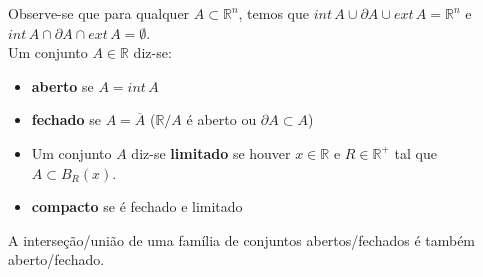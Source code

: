 \documentclass{article}
\begin{document}
Observe-se que para qualquer $A \subset \mathbb{R}^n$, temos que 
$int \, A \cup \partial A \cup ext \, A = \mathbb{R}^n$ e $int \, A \cap \partial A \cap ext \, A = \emptyset$.\\
Um conjunto $A \in \mathbb{R}$ diz-se: \vspace{-0.8mm}
\begin{itemize}
\item \textbf{aberto} se $A= int \, A$ \vspace{-1mm}
\item \textbf{fechado} se $A= \overline{A}$ ($\mathbb{R}/A$ é aberto ou $\partial A \subset A$) \vspace{-0.8mm}
\item Um conjunto $A$ diz-se \textbf{limitado} se houver $x \in \mathbb{R}$ e $R \in \mathbb{R}^+$ tal que $A \subset B_R(x)$.
\item \textbf{compacto} se é fechado e limitado \vspace{-0.8mm}
\end{itemize}
A interseção/união de uma família de conjuntos abertos/fechados é também aberto/fechado.
\end{document}
